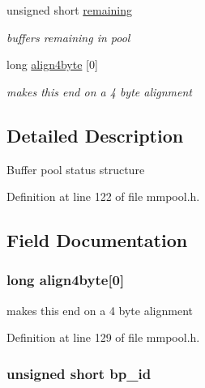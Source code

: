 \begin{DoxyCompactItemize}
unsigned short \hyperlink{struct__bpmf__stats_af85fb64344a8ddeef73280d88e1389ca}{remaining}
\begin{DoxyCompactList}\small\item\em buffers remaining in pool \end{DoxyCompactList}\item 
long \hyperlink{struct__bpmf__stats_a823390f0d6620666782e2371642bfe38}{align4byte} \mbox{[}0\mbox{]}
\begin{DoxyCompactList}\small\item\em makes this end on a 4 byte alignment \end{DoxyCompactList}\end{DoxyCompactItemize}


\subsection{Detailed Description}
Buffer pool status structure 

Definition at line 122 of file mmpool.\-h.



\subsection{Field Documentation}
\hypertarget{struct__bpmf__stats_a823390f0d6620666782e2371642bfe38}{
\subsubsection[{align4byte}]{\setlength{\rightskip}{0pt plus 5cm}long align4byte\mbox{[}0\mbox{]}}}\label{struct__bpmf__stats_a823390f0d6620666782e2371642bfe38}


makes this end on a 4 byte alignment 



Definition at line 129 of file mmpool.\-h.

\hypertarget{struct__bpmf__stats_ae67b46be019334905e0dccdf8415174d}{
\subsubsection[{bp\-\_\-id}]{\setlength{\rightskip}{0pt plus 5cm}unsigned short bp\-\_\-id}}\label{struct__bpmf__stats_ae67b46be019334905e0dccdf8415174d}


